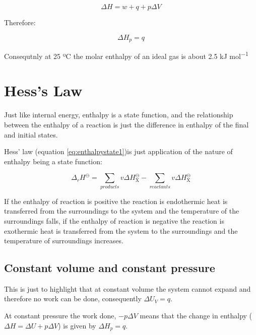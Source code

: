\documentclass[
]{book}
\begin{document}
\begin{equation*}
\Delta H = w + q + p \Delta V
\end{equation*}

Therefore:

\begin{equation}
\Delta H_p = q
\label{eq:enthalpyconstp}
\end{equation}

Consequtnly at 25 ºC the molar enthalpy of an ideal gas is about 2.5 kJ mol\textsuperscript{−1}

\hypertarget{hesss-law}{%
\section{Hess's Law}\label{hesss-law}}

Just like internal energy, enthalpy is a state function, and the relationship between the enthalpy of a reaction is just the difference in enthalpy of the final and initial states.

Hess' law (equation \eqref{eq:enthalpystate1})is just application of the nature of enthalpy being a state function:

\begin{equation}
\Delta_r H^{\ominus} = \sum_{products}v \Delta H^{\ominus}_\textrm{X}-\sum_{reactants}v \Delta H^{\ominus}_\textrm{X}
\label{eq:enthalpystate1}
\end{equation}

If the enthalpy of reaction is positive the reaction is endothermic heat is transferred from the surroundings to the system and the temperature of the surroundings falls, if the enthalpy of reaction is negative the reaction is exothermic heat is transferred from the system to the surroundings and the temperature of surroundings increases.

\hypertarget{constant-volume-and-constant-pressure}{%
\subsection{Constant volume and constant pressure}\label{constant-volume-and-constant-pressure}}

This is just to highlight that at constant volume the system cannot expand and therefore no work can be done, consequently \(\Delta U_V = q\).

At constant pressure the work done, \(-p \Delta V\) means that the change in enthalpy (\(\Delta H = \Delta U + p \Delta V\)) is given by \(\Delta H_p=q\).
\end{document}
